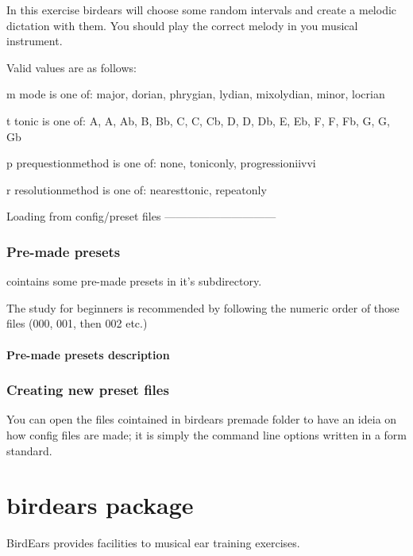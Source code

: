 \documentclass[letterpaper,10pt,english]{sphinxmanual}
\begin{document}
\begin{sphinxVerbatim}[commandchars=\\\{\}]
  In this exercise birdears will choose some random intervals and create a
  melodic dictation with them. You should play the correct melody in you
  musical instrument.

  Valid values are as follows:

  \PYGZhy{}m \PYGZlt{}mode\PYGZgt{} is one of: major, dorian, phrygian, lydian, mixolydian, minor,
  locrian

  \PYGZhy{}t \PYGZlt{}tonic\PYGZgt{} is one of: A, A\PYGZsh{}, Ab, B, Bb, C, C\PYGZsh{}, Cb, D, D\PYGZsh{}, Db, E, Eb, F,
  F\PYGZsh{}, Fb, G, G\PYGZsh{}, Gb

  \PYGZhy{}p \PYGZlt{}prequestion\PYGZus{}method\PYGZgt{} is one of: none, tonic\PYGZus{}only, progression\PYGZus{}i\PYGZus{}iv\PYGZus{}v\PYGZus{}i

  \PYGZhy{}r \PYGZlt{}resolution\PYGZus{}method\PYGZgt{} is one of: nearest\PYGZus{}tonic, repeat\PYGZus{}only
\end{sphinxVerbatim}

Loading from config/preset files
——————————\textendash{}


\subsection{Pre-made presets}
\label{\detokenize{using:pre-made-presets}}
 cointains some pre-made presets in it’s 
subdirectory.

The study for beginners is recommended by following the numeric order of
those files (000, 001, then 002 etc.)


\subsubsection{Pre-made presets description}
\label{\detokenize{using:pre-made-presets-description}}


\subsection{Creating new preset files}
\label{\detokenize{using:creating-new-preset-files}}
You can open the files cointained in birdears premade 
folder to have an ideia on how config files are made; it is simply the
command line options written in a form  standard.


\chapter{birdears package}
\label{\detokenize{birdears:module-birdears}}\label{\detokenize{birdears:birdears-package}}\label{\detokenize{birdears::doc}}
BirdEars provides facilities to musical ear training exercises.
\end{document}
